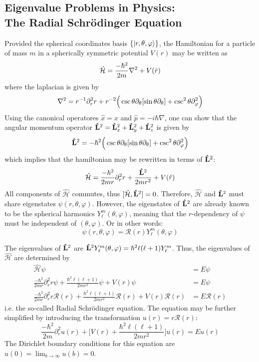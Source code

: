 \documentclass[reprint,english]{revtex4-1}
\newcommand{\Ham}{\hat{\mathcal{H}}}
\begin{document}
\subsection{Eigenvalue Problems in Physics:\\The Radial Schrödinger Equation}\label{sec:radial_scrodinger_equation}
Provided the spherical coordinates basis \(\{\ket{r,\theta,\varphi}\}\), the Hamiltonian for a particle of mass \(m\) in a spherically symmetric potential \(V(r)\) may be written as
\begin{equation}\label{eq:std_hamiltonian}
\Ham=\frac{-\hbar^2}{2m}\laplacian+V(\hat{r})
\end{equation}
where the laplacian is given by
\begin{equation}\label{eq:laplacian_spherical_coordinates}
\laplacian=r^{-1}\partial_r^2r+r^{-2}\Big(\csc\theta\partial_\theta[\sin\theta\partial_\theta]+\csc^2\theta\partial_\varphi^2\Big)
\end{equation}
Using the canonical operatores \(\hat{x}=x\) and \(\hat{p}=-i\hbar\nabla\), one can show that the angular momentum operator \(\vu{L}^2=\vu{L}_x^2+\vu{L}_y^2+\vu{L}_z^2\) is given by
\[\vu{L}^2=-\hbar^2\Big(\csc\theta\partial_\theta[\sin\theta\partial_\theta]+\csc^2\theta\partial_\varphi^2\Big)\]
which implies that the hamiltonian may be rewritten in terms of \(\vu{L}^2\):
\begin{equation}\label{eq:hamiltonian_via_L2}
\Ham=\frac{-\hbar^2}{2mr}\partial_r^2r+\frac{\vu{L}^2}{2mr^2}+V(\hat{r})
\end{equation}
All components of \(\Ham\) commutes, thus \([\Ham,\vu{L}^2]=0\). Therefore, \(\Ham\) and \(\vu{L}^2\) must share eigenstates \(\psi(r,\theta,\varphi)\). However, the eigenstates of \(\vu{L}^2\) are already known to be the spherical harmonics \(Y_\ell^m(\theta,\varphi)\), meaning that the \(r\)-dependency of \(\psi\) must be independent of \((\theta,\varphi)\). Or in other words:
\begin{equation}\label{eq:eigenstates_hamiltonian_L2}
\psi(r,\theta,\varphi)=\mathcal{R}(r)Y_\ell^m(\theta,\varphi)
\end{equation}

The eigenvalues of \(\vu{L}^2\) are \(\vu{L}^2Y_\ell^m(\theta,\varphi)=\hbar^2\ell(\ell+1)Y_\ell^m\). Thus, the eigenvalues of \(\Ham\) are determined by
\begin{align}
\Ham\psi&=E\psi\nonumber\\
\frac{-\hbar^2}{2mr}\partial_r^2r\psi+\frac{\hbar^2\ell(\ell+1)}{2mr^2}\psi+V(r)\psi&=E\psi\nonumber\\
\frac{-\hbar^2}{2mr}\partial_r^2r\mathcal{R}(r)+\frac{\hbar^2\ell(\ell+1)}{2mr^2}\mathcal{R}(r)+V(r)\mathcal{R}(r)&=E\mathcal{R}(r)\nonumber
\end{align}
i.e. the so-called Radial Schrödinger equation. The equation may be further simplified by introducing the transformation \(u(r)=r\mathcal{R}(r)\):
\begin{equation}\label{eq:radial_schrodinger_equation_simplified}
\frac{-\hbar^2}{2m}\partial_r^2u(r)+\Big[V(r)+\frac{\hbar^2\ell(\ell+1)}{2mr^2}\Big]u(r)=Eu(r)
\end{equation}
The Dirichlet boundary conditions for this equation are \(u(0)=\displaystyle\lim_{b\to\infty}u(b)=0\).
\end{document}
